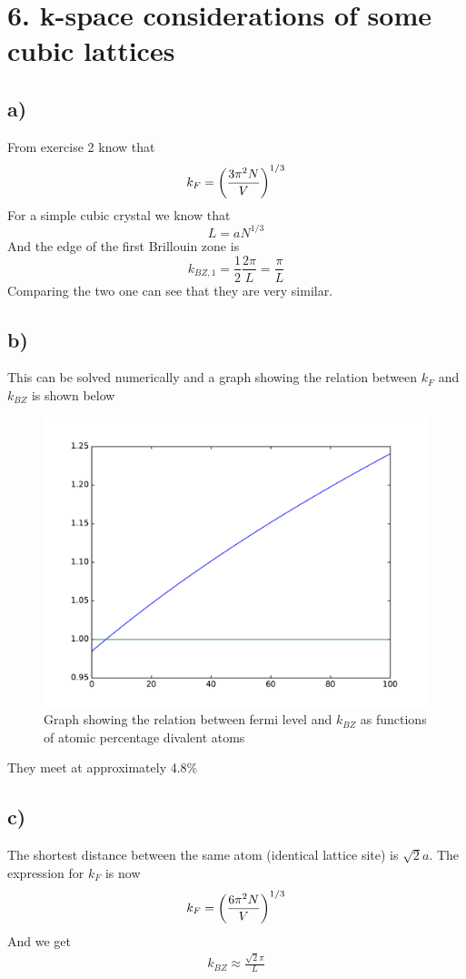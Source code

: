 \documentclass{article}
\begin{document}
\newpage
\section*{ 6. k-space considerations of some cubic lattices }
\subsection*{a)}
From exercise 2 know that
\begin{equation*}
	k_F = \qty(\frac{3\pi^2N}{V})^{1/3}
\end{equation*}
For a simple cubic crystal we know that 
\begin{equation*}
	L=aN^{1/3}
\end{equation*}
And the edge of the first Brillouin zone is
\begin{equation*}
	k_{BZ,1} = \frac{1}{2}\frac{2\pi}{L}=\frac{\pi}{L}
\end{equation*}
Comparing the two one can see that they are very similar.

\subsection*{b)}
This can be solved numerically and a graph showing the relation between $k_F$ and $k_{BZ}$ is shown below

\begin{figure}[H]
	\includegraphics[width = 0.7\linewidth]{alloy.pdf}
	\centering
	\caption{Graph showing the relation between fermi level and $k_{BZ}$ as functions of atomic percentage divalent atoms} 
\end{figure}

They meet at approximately 4.8\%

\subsection*{c)}
The shortest distance between the same atom (identical lattice site) is $\sqrt{2}a$.
The expression for $k_F$ is now
\begin{equation*}
	k_F=\qty(\frac{6\pi^2N}{V})^{1/3}
\end{equation*}
And we get
\begin{align*}
	k_{BZ} \approx \frac{\sqrt{2}\pi}{L}
\end{align*}
\end{document}
